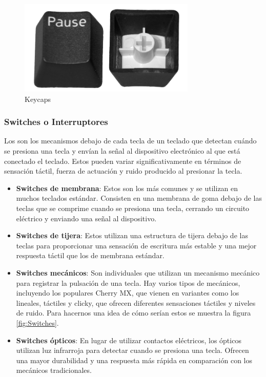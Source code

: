 \begin{figure}[H]
    \centering
    \includegraphics[width=0.75\textwidth]{imagenes/Capitulos/Cap03/Keycaps.png}
    \caption{Keycaps \cite{KeycapsImageSource}}
    \label{fig:Keycaps}
\end{figure}

\subsubsection{\gls{Switches} o Interruptores}

Los  son los mecanismos debajo de cada tecla de un teclado que detectan cuándo se presiona una tecla y envían la señal al dispositivo electrónico al que está conectado el teclado. Estos  pueden variar significativamente en términos de sensación táctil, fuerza de actuación y ruido producido al presionar la tecla.

\begin{itemize}
  \item \textbf{\gls{Switches} de membrana}: Estos son los más comunes y se utilizan en muchos teclados estándar. Consisten en una membrana de goma debajo de las teclas que se comprime cuando se presiona una tecla, cerrando un circuito eléctrico y enviando una señal al dispositivo.
  
  \item \textbf{\gls{Switches} de tijera}: Estos  utilizan una estructura de tijera debajo de las teclas para proporcionar una sensación de escritura más estable y una mejor respuesta táctil que los  de membrana estándar.
  
  \item \textbf{\gls{Switches} mecánicos}: Son  individuales que utilizan un mecanismo mecánico para registrar la pulsación de una tecla. Hay varios tipos de  mecánicos, incluyendo los populares  Cherry MX, que vienen en variantes como los  lineales, táctiles y clicky, que ofrecen diferentes sensaciones táctiles y niveles de ruido. Para hacernos una idea de cómo serían estos  se muestra la figura \ref{fig:Switches}.
  
  \item \textbf{\gls{Switches} ópticos}: En lugar de utilizar contactos eléctricos, los  ópticos utilizan luz infrarroja para detectar cuando se presiona una tecla. Ofrecen una mayor durabilidad y una respuesta más rápida en comparación con los  mecánicos tradicionales.
\end{itemize}

